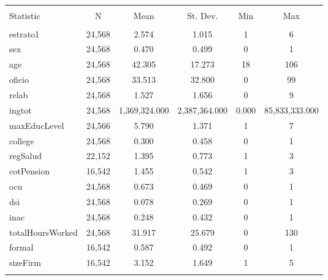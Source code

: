 \begin{table}[!htbp] \centering 
  \caption{} 
  \label{} 
\begin{tabular}{@{\extracolsep{5pt}}lccccc} 
\\[-1.8ex]\hline 
\hline \\[-1.8ex] 
Statistic & \multicolumn{1}{c}{N} & \multicolumn{1}{c}{Mean} & \multicolumn{1}{c}{St. Dev.} & \multicolumn{1}{c}{Min} & \multicolumn{1}{c}{Max} \\ 
\hline \\[-1.8ex] 
estrato1 & 24,568 & 2.574 & 1.015 & 1 & 6 \\ 
sex & 24,568 & 0.470 & 0.499 & 0 & 1 \\ 
age & 24,568 & 42.305 & 17.273 & 18 & 106 \\ 
oficio & 24,568 & 33.513 & 32.800 & 0 & 99 \\ 
relab & 24,568 & 1.527 & 1.656 & 0 & 9 \\ 
ingtot & 24,568 & 1,369,324.000 & 2,387,364.000 & 0.000 & 85,833,333.000 \\ 
maxEducLevel & 24,566 & 5.790 & 1.371 & 1 & 7 \\ 
college & 24,568 & 0.300 & 0.458 & 0 & 1 \\ 
regSalud & 22,152 & 1.395 & 0.773 & 1 & 3 \\ 
cotPension & 16,542 & 1.455 & 0.542 & 1 & 3 \\ 
ocu & 24,568 & 0.673 & 0.469 & 0 & 1 \\ 
dsi & 24,568 & 0.078 & 0.269 & 0 & 1 \\ 
inac & 24,568 & 0.248 & 0.432 & 0 & 1 \\ 
totalHoursWorked & 24,568 & 31.917 & 25.679 & 0 & 130 \\ 
formal & 16,542 & 0.587 & 0.492 & 0 & 1 \\ 
sizeFirm & 16,542 & 3.152 & 1.649 & 1 & 5 \\ 
\hline \\[-1.8ex] 
\end{tabular} 
\end{table} 
